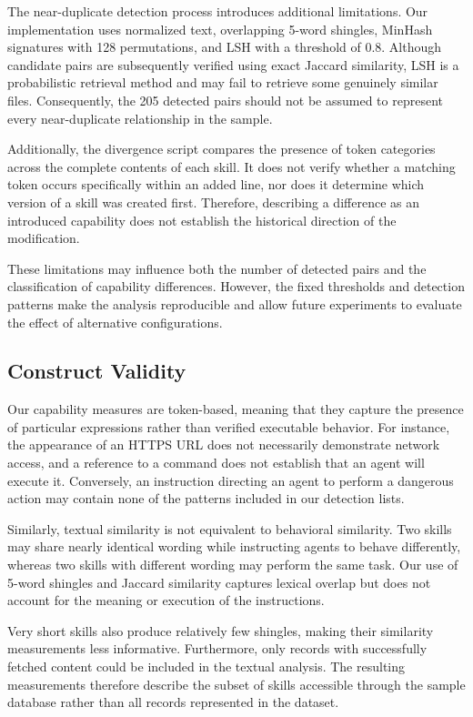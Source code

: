 \documentclass[sigconf,review]{acmart}
\begin{document}
The near-duplicate detection process introduces additional limitations. Our implementation uses normalized text, overlapping 5-word shingles, MinHash signatures with 128 permutations, and LSH with a threshold of 0.8. Although candidate pairs are subsequently verified using exact Jaccard similarity, LSH is a probabilistic retrieval method and may fail to retrieve some genuinely similar files. Consequently, the 205 detected pairs should not be assumed to represent every near-duplicate relationship in the sample.

Additionally, the divergence script compares the presence of token categories across the complete contents of each skill. It does not verify whether a matching token occurs specifically within an added line, nor does it determine which version of a skill was created first. Therefore, describing a difference as an introduced capability does not establish the historical direction of the modification.

These limitations may influence both the number of detected pairs and the classification of capability differences. However, the fixed thresholds and detection patterns make the analysis reproducible and allow future experiments to evaluate the effect of alternative configurations.

\subsection{Construct Validity}

Our capability measures are token-based, meaning that they capture the presence of particular expressions rather than verified executable behavior. For instance, the appearance of an HTTPS URL does not necessarily demonstrate network access, and a reference to a command does not establish that an agent will execute it. Conversely, an instruction directing an agent to perform a dangerous action may contain none of the patterns included in our detection lists.

Similarly, textual similarity is not equivalent to behavioral similarity. Two skills may share nearly identical wording while instructing agents to behave differently, whereas two skills with different wording may perform the same task. Our use of 5-word shingles and Jaccard similarity captures lexical overlap but does not account for the meaning or execution of the instructions.

Very short skills also produce relatively few shingles, making their similarity measurements less informative. Furthermore, only records with successfully fetched content could be included in the textual analysis. The resulting measurements therefore describe the subset of skills accessible through the sample database rather than all records represented in the dataset.
\end{document}
